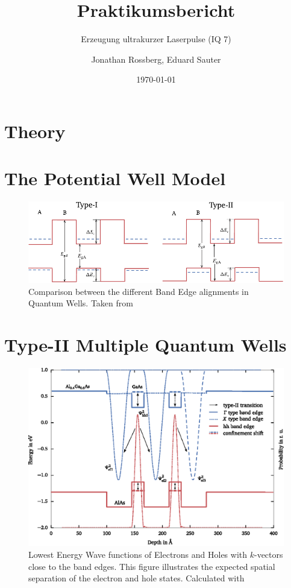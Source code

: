 \documentclass[11pt,twoside=true]{scrartcl}
\title{Praktikumsbericht}
\subtitle{Erzeugung ultrakurzer Laserpulse (IQ 7)}
\author{Jonathan Rossberg,
      Eduard Sauter}
\date{\today}
\begin{document}
\maketitle

\section{Theory}
\section{The Potential Well Model}
\begin{figure}[h!]
  \centering
  \includegraphics[width=1\textwidth]{./figures/quantum_well_types}
  \caption{Comparison between the different Band Edge alignments in Quantum 
  Wells. Taken from \cite{yucardona}}
  \label{fig:quantum_well_types}
\end{figure}



\section{Type-II Multiple Quantum Wells}
\begin{figure}[h!]
  \centering
  \includegraphics[width=\textwidth]{./figures/samplegaas_spatial_bandstructure.eps}
  \caption{
    Lowest Energy Wave functions of Electrons and Holes with $k$-vectors close to the band edges.
    This figure illustrates the expected spatial separation of the electron
    and hole states. Calculated with \cite{snider19901d}
  } 
  \label{fig:} 
\end{figure}
\end{document}
